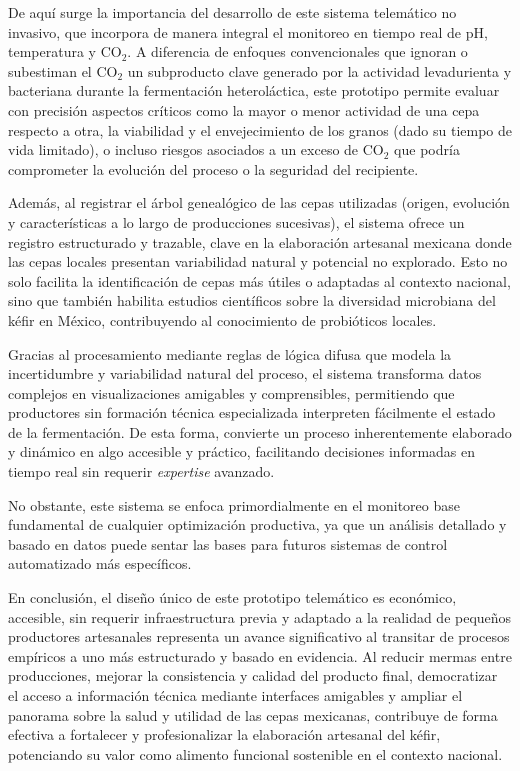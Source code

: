 De aquí surge la importancia del desarrollo de este sistema telemático no invasivo, 
que incorpora de manera integral el monitoreo en tiempo real de pH, temperatura y CO$_2$. 
A diferencia de enfoques convencionales que ignoran o subestiman el CO$_2$ un subproducto 
clave generado por la actividad levadurienta y bacteriana durante la fermentación heteroláctica, 
este prototipo permite evaluar con precisión aspectos críticos como la mayor o menor actividad 
de una cepa respecto a otra, la viabilidad y el envejecimiento de los granos 
(dado su tiempo de vida limitado), o incluso riesgos asociados a un exceso de CO$_2$ que podría comprometer
 la evolución del proceso o la seguridad del recipiente.

Además, al registrar el árbol genealógico de las cepas utilizadas 
(origen, evolución y características a lo largo de producciones sucesivas),
 el sistema ofrece un registro estructurado y trazable, clave en la elaboración artesanal 
 mexicana donde las cepas locales presentan variabilidad natural y potencial no explorado. 
 Esto no solo facilita la identificación de cepas más útiles o adaptadas al contexto nacional, 
 sino que también habilita estudios científicos sobre la diversidad microbiana del kéfir en México, 
 contribuyendo al conocimiento de probióticos locales.

Gracias al procesamiento mediante reglas de lógica difusa que modela la incertidumbre 
y variabilidad natural del proceso, el sistema transforma datos complejos en visualizaciones 
amigables y comprensibles, permitiendo que productores sin formación técnica especializada 
interpreten fácilmente el estado de la fermentación. De esta forma, convierte un proceso
 inherentemente elaborado y dinámico en algo accesible y práctico, facilitando decisiones informadas
  en tiempo real sin requerir \textit{expertise} avanzado.

No obstante, este sistema se enfoca primordialmente en el monitoreo base 
fundamental de cualquier optimización productiva, ya que un análisis detallado y
 basado en datos puede sentar las bases para futuros sistemas de control automatizado más específicos.

En conclusión, el diseño único de este prototipo telemático es económico, accesible, 
sin requerir infraestructura previa y adaptado a la realidad de pequeños productores 
artesanales representa un avance significativo al transitar de procesos empíricos a uno 
más estructurado y basado en evidencia. Al reducir mermas entre producciones, mejorar la 
consistencia y calidad del producto final, democratizar el acceso a información técnica mediante
 interfaces amigables y ampliar el panorama sobre la salud y utilidad de las cepas mexicanas, 
 contribuye de forma efectiva a fortalecer y profesionalizar la elaboración artesanal del kéfir, 
 potenciando su valor como alimento funcional sostenible en el contexto nacional.

